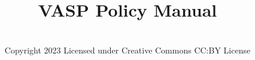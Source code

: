 \documentclass[]{report}
\title{VASP Policy Manual}
\author{\firmfullname\\Copyright 2023 Licensed under Creative Commons
  CC:BY License}
\def\firmtag{twofish}
\begin{document}
\maketitle
\tableofcontents
\newpage
\listofcrossref
\newpage
\listofstatus








\appendix


\end{document}
